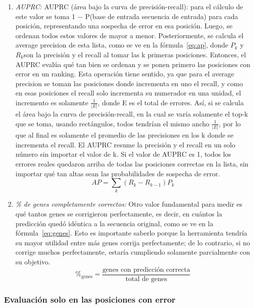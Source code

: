 \documentclass[sigconf,nonacm]{acmart}
\begin{document}
\begin{enumerate}
\item \emph{AUPRC:} AUPRC (área bajo la curva de precisión-recall): para el cálculo de este valor se toma 1 − P(base de entrada \textbar{} secuencia de entrada) para cada posición, representando una sospecha de error en esa posición. Luego, se ordenan todos estos valores de mayor a menor. Posteriormente, se calcula el average precision de esta lista, como se ve en la fórmula~\eqref{eq:ap}, donde \(P_{k}\) y \(R_{k}\)son la precisión y el recall al tomar las k primeras posiciones. Entonces, el AUPRC evalúa qué tan bien se ordenan y se ponen primero las posiciones con error en un ranking. Esta operación tiene sentido, ya que para el average precision se toman las posiciones donde incrementa en uno el recall, y como en esas posiciones el recall solo incrementa su numerador en una unidad, el incremento es solamente \(\frac{1}{|E|}\), donde \textbar E\textbar{} es el total de errores. Así, si se calcula el área bajo la curva de precisión-recall, en la cual se varía solamente el top-k que se toma, usando rectángulos, todos tendrían el mismo ancho \(\frac{1}{|E|}\), por lo que al final es solamente el promedio de las precisiones en los k donde se incrementa el recall. El AUPRC resume la precisión y el recall en un solo número sin importar el valor de k. Si el valor de AUPRC es 1, todos los errores reales quedaron arriba de todas las posiciones correctas en la lista, sin importar qué tan altas sean las probabilidades de sospecha de error.~\cite{sklearn_ap}
\begin{equation}\label{eq:ap}
AP = \sum_{k} (R_{k} - R_{k-1}) P_{k}
\end{equation}

\item \emph{\% de genes completamente correctos:} Otro valor fundamental para medir es qué tantos genes se corrigieron perfectamente, es decir, en cuántos la predicción quedó idéntica a la secuencia original, como se ve en la fórmula~\eqref{eq:genes}. Esto es importante saberlo porque la herramienta tendría su mayor utilidad entre más genes corrija perfectamente; de lo contrario, si no corrige muchos perfectamente, estaría cumpliendo solamente parcialmente con su objetivo.
\begin{equation}\label{eq:genes}
\%_{\mathrm{genes}} = \frac{\text{genes con predicción correcta}}{\text{total de genes}}
\end{equation}

\end{enumerate}

\subsubsection{Evaluación solo en las posiciones con error}\label{sec:oraculo}
\end{document}
